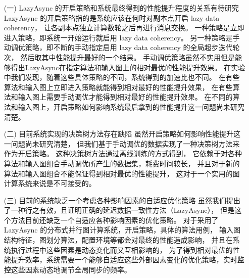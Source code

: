 \begin{enumerate}      
  \item[(一)] LazyAsync 的开启策略和系统最终得到的性能提升程度的关系有待研究 \newline\indent
    LazyAsync 的开启策略指的是系统应该在何时对副本点开启 lazy data coherency，
    让各副本点独立计算数轮之后再进行消息交换。
    一种策略是立即进入策略，即系统一开始运行就启用 lazy data coherency。
    另一种策略是手动调优策略，即不断的手动指定启用 lazy data coherency 的全局超步迭代轮次，
    然后取其中性能提升最好的一个结果。
    手动调优策略虽然不实用但是能够得出LazyAsync在指定算法和输入图上的相对最优的性能提升效果。
    在实验中我们发现，随着这些具体策略的不同，系统得到的加速比也不同。
    在有些算法和输入图上立即进入策略就能得到相对最好的性能提升效果，
    在有些算法和输入图上需要手动调优才能得到相对最好的性能提升效果。
    在不同的算法和输入图上，开启策略如何影响系统最后拿到的性能提升这一问题尚未研究清楚。

  \item[(二)] 目前系统实现的决策树方法存在缺陷 \newline\indent
    虽然开启策略如何影响性能提升这一问题尚未研究清楚，
    但我们基于手动调优的数据实现了一种决策树方法来作为开启策略。
    这种决策树方法通过离线训练的方式得到，
    它依赖于对各种算法和输入图组合手动调优所产生的数据集，耗费时间较长，
    并且对于新的算法和输入图组合不能保证得到相对最优的性能提升，
    这对于一个实用的图计算系统来说是不可接受的。

  \item[(三)] 目前的系统缺乏一个考虑各种影响因素的自适应优化策略 \newline\indent
    虽然我们提出了一种行之有效，且证明正确的延迟数据一致性方法（LazyAsync），
    但是这个方法目前还缺乏一个自适应各种影响因素的优化策略。
    对于采用了 LazyAsync 的分布式并行图计算系统，开启策略，具体的算法用例，
    输入图结构特征，图划分算法，配置环境等都会对最终的性能造成影响，
    并且在系统执行过程中这些因素是动态变化而又互相影响的，
    为了得到相对最优的性能提升效率，系统需要一个能够自适应这些外部因素变化的优化策略，实时监控这些因素动态地调节全局同步的频率。          
\end{enumerate}

